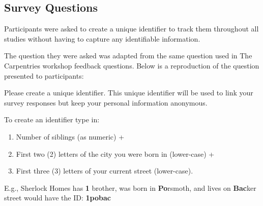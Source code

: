 \documentclass[030-workshop.tex]{subfiles}
\begin{document}
\subsection{Survey Questions}
\label{sse:assessment-study}

Participants were asked to create a unique identifier to track them throughout all studies without
having to capture any identifiable information.

The question they were asked was adapted from the same question used in The Carpentries
workshop feedback questions. %
Below is a reproduction of the question presented to participants:

\begin{displayquote}
    Please create a unique identifier.
    This unique identifier will be used to link your survey responses but keep your personal information anonymous.

    To create an identifier type in:
    \begin{enumerate}
        \item Number of siblings (as numeric) +
        \item First two (2) letters of the city you were born in (lower-case) +
        \item First three (3) letters of your current street (lower-case).
    \end{enumerate}

    E.g., Sherlock Homes has \textbf{1} brother,
    was born in \textbf{Po}rsmoth,
    and lives on \textbf{Bac}ker street would have the ID: \textbf{1pobac}
\end{displayquote}
\end{document}
